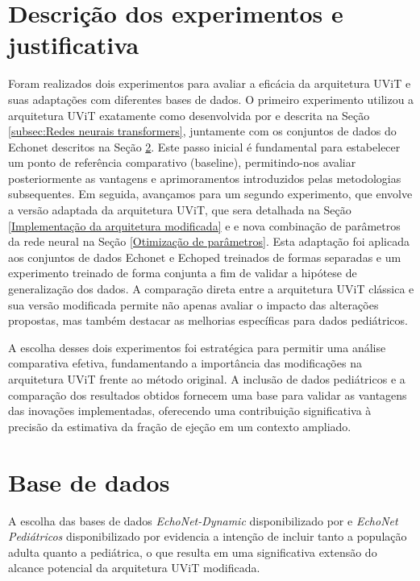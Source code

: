 \section{Descrição dos experimentos e justificativa}
\label{subsec:descricao_experimentos}

Foram realizados dois experimentos para avaliar a eficácia da arquitetura UViT e suas adaptações com diferentes bases de dados. O primeiro experimento utilizou a arquitetura UViT exatamente como desenvolvida por \textcite{Reynald} e descrita na Seção \ref{subsec:Redes neurais transformers}, juntamente com os conjuntos de dados do Echonet descritos na Seção \ref{Base de dados}. Este passo inicial é fundamental para estabelecer um ponto de referência comparativo (baseline), permitindo-nos avaliar posteriormente as vantagens e aprimoramentos introduzidos pelas metodologias subsequentes. Em seguida, avançamos para um segundo experimento, que envolve a versão adaptada da arquitetura UViT, que sera detalhada na Seção  \ref{Implementação da arquitetura modificada} e e nova combinação de parâmetros da rede neural na Seção \ref{Otimização de parâmetros}. Esta adaptação foi  aplicada aos conjuntos de dados Echonet e Echoped treinados de formas separadas e um experimento treinado de forma conjunta a fim de validar a hipótese de generalização dos dados. A comparação direta entre a arquitetura UViT clássica e sua versão modificada permite não apenas avaliar o impacto das alterações propostas, mas também destacar as melhorias específicas para dados pediátricos.

A escolha desses dois experimentos foi estratégica para permitir uma análise comparativa efetiva, fundamentando a importância das modificações na arquitetura UViT frente ao método original. A inclusão de dados pediátricos e a comparação dos resultados obtidos fornecem uma base para validar as vantagens das inovações implementadas, oferecendo uma contribuição significativa à precisão da estimativa da fração de ejeção em um contexto ampliado.

\section{Base de dados}
\label{Base de dados}

A escolha das bases de dados \textit{EchoNet-Dynamic} disponibilizado por \cite{Ouyang2020} e \textit{EchoNet Pediátricos} disponibilizado por \cite{Reddy2023} evidencia a intenção de incluir tanto a população adulta quanto a pediátrica, o que resulta em uma significativa extensão do alcance potencial da arquitetura UViT modificada.

